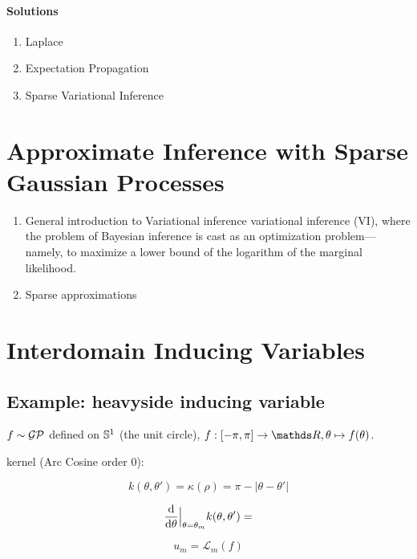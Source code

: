 \paragraph{Solutions}
\begin{enumerate}
  \item Laplace
  \item Expectation Propagation
  \item Sparse Variational Inference
\end{enumerate}


\section{Approximate Inference with Sparse Gaussian Processes}

\begin{enumerate}
  \item General introduction to Variational inference \citep{blei2017variational}
variational inference (VI), where the problem of Bayesian inference is cast as an optimization problem—namely, to maximize a lower bound of the logarithm of the marginal likelihood.
  \item Sparse approximations \citep{Snelson05,quinonero2005unifying}
\end{enumerate}

\section{Interdomain Inducing Variables}

\subsection{Example: heavyside inducing variable}

$f \sim \mathcal{GP}$ defined on $\mathbb{S}^1$ (the unit circle), $f: [-\pi, \pi] \rightarrow \Reals, \theta \mapsto f(\theta)$.

kernel (Arc Cosine order 0):

\begin{equation}
  k(\theta, \theta') = \kappa(\rho) = \pi - |\theta - \theta'|
\end{equation}

\begin{equation}
  \frac{\mathrm{d}{}}{\mathrm{d}{\theta}}\Bigr|_{\theta = \theta_m} k(\theta, \theta') = 
\end{equation}

\begin{equation}
  u_m = \mathcal{L}_m(f)
\end{equation}

